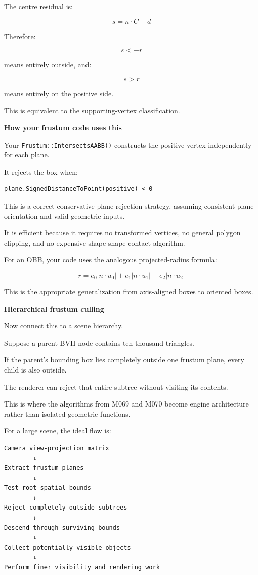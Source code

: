 The centre residual is:

\[
s=n\cdot C+d
\]

Therefore:

\[
s<-r
\]

means entirely outside, and:

\[
s>r
\]

means entirely on the positive side.

This is equivalent to the supporting-vertex classification.

\textbf{How your frustum code uses this}

Your \texttt{Frustum::IntersectsAABB()} constructs the positive vertex independently for each plane.

It rejects the box when:

\begin{verbatim}
plane.SignedDistanceToPoint(positive) < 0
\end{verbatim}

This is a correct conservative plane-rejection strategy, assuming consistent plane orientation and valid geometric inputs.

It is efficient because it requires no transformed vertices, no general polygon clipping, and no expensive shape-shape contact algorithm.

For an OBB, your code uses the analogous projected-radius formula:

\[
r= e_0|n\cdot u_0| + e_1|n\cdot u_1| + e_2|n\cdot u_2|
\]

This is the appropriate generalization from axis-aligned boxes to oriented boxes.

\textbf{Hierarchical frustum culling}

Now connect this to a scene hierarchy.

Suppose a parent BVH node contains ten thousand triangles.

If the parent's bounding box lies completely outside one frustum plane, every child is also outside.

The renderer can reject that entire subtree without visiting its contents.

This is where the algorithms from M069 and M070 become engine architecture rather than isolated geometric functions.

For a large scene, the ideal flow is:

\begin{verbatim}
Camera view-projection matrix
        ↓
Extract frustum planes
        ↓
Test root spatial bounds
        ↓
Reject completely outside subtrees
        ↓
Descend through surviving bounds
        ↓
Collect potentially visible objects
        ↓
Perform finer visibility and rendering work
\end{verbatim}

